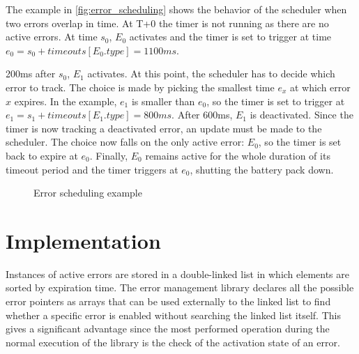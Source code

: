 The example in \autoref{fig:error_scheduling} shows the behavior of the scheduler when two errors overlap in time. At T+0 the timer is not running as there are no active errors. At time $s_0$, $E_0$ activates and the timer is set to trigger at time $e_0=s_0+timeouts[E_0.type]=1100ms$.

200ms after $s_0$, $E_1$ activates. At this point, the scheduler has to decide which error to track. The choice is made by picking the smallest time $e_x$ at which error $x$ expires. In the example, $e_1$ is smaller than $e_0$, so the timer is set to trigger at $e_1=s_1+timeouts[E_1.type]=800ms$. After 600ms, $E_1$ is deactivated. Since the timer is now tracking a deactivated error, an update must be made to the scheduler. The choice now falls on the only active error: $E_0$, so the timer is set back to expire at $e_0$. Finally, $E_0$ remains active for the whole duration of its timeout period and the timer triggers at $e_0$, shutting the battery pack down.

\begin{figure}[h]
	\centering
	
	\caption{Error scheduling example}
	\label{fig:error_scheduling}
\end{figure}

\section{Implementation}
Instances of active errors are stored in a double-linked list \cite{llist} in which elements are sorted by expiration time. The error management library declares all the possible error pointers as arrays that can be used externally to the linked list to find whether a specific error is enabled without searching the linked list itself. This gives a significant advantage since the most performed operation during the normal execution of the library is the check of the activation state of an error.


